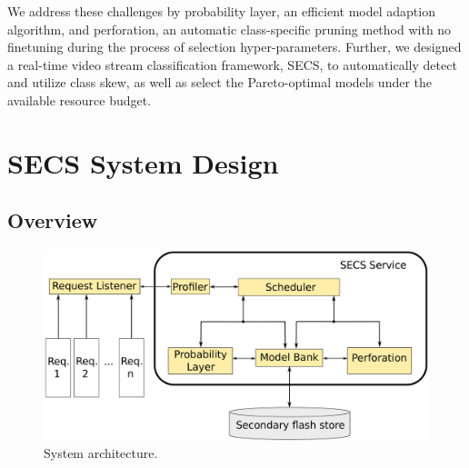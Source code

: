 \documentclass[pageno]{jpaper}
\begin{document}
We address these challenges by probability layer, an efficient model adaption algorithm, and perforation, an automatic class-specific pruning method with no finetuning during the process of selection hyper-parameters. Further, we designed a real-time video stream classification framework, SECS, to automatically detect and utilize class skew, as well as select the Pareto-optimal models under the available resource budget.
























\section{SECS System Design} \label{SECS}
\subsection{Overview}

\begin{figure} 
\includegraphics[scale=0.095]{architecture.png}
\caption{System architecture.}
\label{fig:Architecture}
\end{figure}
\end{document}
